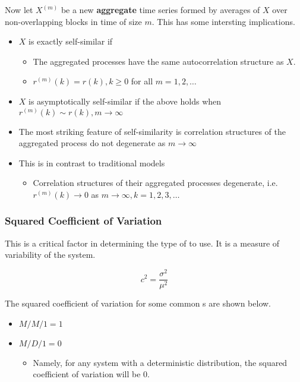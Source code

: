 Now let $X^{(m)}$ be a new \textbf{aggregate} time series formed by averages of $X$ over non-overlapping blocks in time of size $m$.
This has some intersting implications.
\begin{itemize}[noitemsep]
\item $X$ is exactly self-similar if
  \begin{itemize}[noitemsep]
  \item The aggregated processes have the same autocorrelation structure as $X$.
  \item $r^{(m)}(k) = r(k), k \geq 0$ for all $m = 1, 2, \ldots$
  \end{itemize}

\item $X$ is asymptotically self-similar if the above holds when $r^{(m)}(k) \sim r(k), m \rightarrow \infty$
\item The most striking feature of self-similarity is correlation structures of the aggregated process do not degenerate as $m \rightarrow \infty$
\item This is in contrast to traditional models
  \begin{itemize}[noitemsep]
  \item Correlation structures of their aggregated processes degenerate, i.e.\ $r^{(m)}(k) \rightarrow 0$ as $m \rightarrow \infty, k = 1, 2, 3, \ldots$
  \end{itemize}
\end{itemize}

\subsubsection{Squared Coefficient of Variation}\label{subsubsec:Squared_Coefficient_Variation}
This is a critical factor in determining the type of  to use.
It is a measure of variability of the system.

\begin{equation}\label{eq:Squared_Coefficient_Variation}
  c^{2} = \frac{\sigma^{2}}{\mu^{2}}
\end{equation}

The squared coefficient of variation for some common s are shown below.
\begin{itemize}[noitemsep]
\item $M/M/1 = 1$
\item $M/D/1 = 0$
  \begin{itemize}[noitemsep]
  \item Namely, for any system with a deterministic distribution, the squared coefficient of variation will be 0.
  \end{itemize}
\end{itemize}

